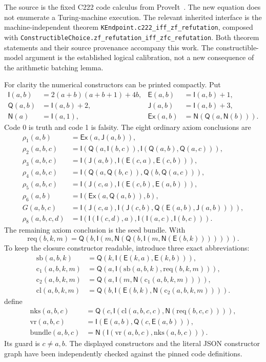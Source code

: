 \documentclass[11pt]{article}
\theoremstyle{definition}
\theoremstyle{remark}
\newcommand{\File}[1]{\nolinkurl{#1}}
\newcommand{\I}{\mathsf I}
\newcommand{\E}{\mathsf E}
\newcommand{\Q}{\mathsf Q}
\newcommand{\J}{\mathsf J}
\newcommand{\Neg}{\mathsf N}
\newcommand{\Ex}{\mathsf{Ex}}
\begin{document}
The source is the fixed C222 code calculus from ProveIt~\cite{calculus}.
The new equation does not enumerate a Turing-machine execution.
The relevant inherited interface is the machine-independent theorem
\File{KEndpoint.c222_iff_zf_refutation}, composed with
\File{ConstructibleChoice.zf_refutation_iff_zfc_refutation}.
Both theorem statements and their source provenance accompany this work.
The constructible-model argument is the established logical calibration,
not a new consequence of the arithmetic batching lemma.

For clarity the numerical constructors can be printed compactly. Put
\begin{align*}
 \I(a,b)&=2(a+b)(a+b+1)+4b,&
 \E(a,b)&=\I(a,b)+1,\\
 \Q(a,b)&=\I(a,b)+2,&
 \J(a,b)&=\I(a,b)+3,\\
 \Neg(a)&=\I(a,1),&
 \Ex(a,b)&=\Neg(\Q(a,\Neg(b))).
\end{align*}
Code 0 is truth and code 1 is falsity. The eight ordinary axiom
conclusions are
\begin{align*}
 \rho_1(a,b)&=\Ex(a,\J(a,b)),\\
 \rho_2(a,b,c)&=\I(\Q(a,\I(b,c)),\I(\Q(a,b),\Q(a,c))),\\
 \rho_3(a,b,c)&=\I(\J(a,b),\I(\E(c,a),\E(c,b))),\\
 \rho_4(a,b,c)&=\I(\Q(a,\Q(b,c)),\Q(b,\Q(a,c))),\\
 \rho_5(a,b,c)&=\I(\J(c,a),\I(\E(c,b),\E(a,b))),\\
 \rho_6(a,b)&=\I(\Ex(a,\Q(a,b)),b),\\
 G(a,b,c)&=\I(\J(c,a),\I(\J(c,b),\Q(\E(a,b),\J(a,b)))),\\
 \rho_8(a,b,c,d)&=\I(\I(\I(c,d),a),\I(\I(a,c),\I(b,c))).
\end{align*}
The remaining axiom conclusion is the seed bundle. With
\[
 \mathrm{req}(b,k,m)=\Q(b,\I(m,\Neg(\Q(b,\I(m,\Neg(\E(b,k))))))).
\]
To keep the closure constructor readable, introduce three exact abbreviations:
\begin{align*}
 \mathrm{sb}(a,b,k)&=\Q(k,\I(\E(k,a),\E(k,b))),\\
 \mathrm{c}_1(a,b,k,m)&=\Q(a,\I(\mathrm{sb}(a,b,k),\mathrm{req}(b,k,m))),\\
 \mathrm{c}_2(a,b,k,m)&=\Q(a,\I(m,\Neg(\mathrm{c}_1(a,b,k,m)))),\\
 \mathrm{cl}(a,b,k,m)&=\Q(b,\I(\E(b,k),\Neg(\mathrm{c}_2(a,b,k,m)))).
\end{align*}
define
\begin{align*}
 \mathrm{nks}(a,b,c)&=\Q(c,\I(\mathrm{cl}(a,b,c,c),\Neg(\mathrm{req}(b,c,c)))),\\
 \mathrm{vr}(a,b,c)&=\I(\E(a,b),\Q(c,\E(a,b))),\\
 \mathrm{bundle}(a,b,c)&=\Neg(\I(\mathrm{vr}(a,b,c),\mathrm{nks}(a,b,c))).
\end{align*}
Its guard is $c\ne a,b$. The displayed constructors and the literal
JSON constructor graph have been independently checked against the
pinned code definitions.
\end{document}
